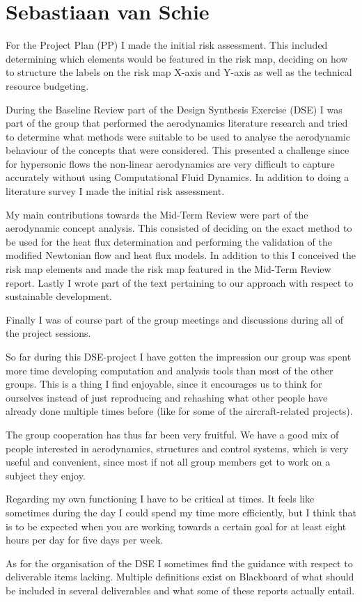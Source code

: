 \section{Sebastiaan van Schie}
For the Project Plan (PP) I made the initial risk assessment. This included determining which elements would be featured in the risk map, deciding on how to structure the labels on the risk map X-axis and Y-axis as well as the technical resource budgeting.

During the Baseline Review part of the Design Synthesis Exercise (DSE) I was part of the group that performed the aerodynamics literature research and tried to determine what methods were suitable to be used to analyse the aerodynamic behaviour of the concepts that were considered. This presented a challenge since for hypersonic flows the non-linear aerodynamics are very difficult to capture accurately without using Computational Fluid Dynamics. In addition to doing a literature survey I made the initial risk assessment.

My main contributions towards the Mid-Term Review were part of the aerodynamic concept analysis. This consisted of deciding on the exact method to be used for the heat flux determination and performing the validation of the modified Newtonian flow and heat flux models. In addition to this I conceived the risk map elements and made the risk map featured in the Mid-Term Review report. Lastly I wrote part of the text pertaining to our approach with respect to sustainable development.

Finally I was of course part of the group meetings and discussions during all of the project sessions. 

So far during this DSE-project I have gotten the impression our group was spent more time developing computation and analysis tools than most of the other groups. This is a thing I find enjoyable, since it encourages us to think for ourselves instead of just reproducing and rehashing what other people have already done multiple times before (like for some of the aircraft-related projects). 

The group cooperation has thus far been very fruitful. We have a good mix of people interested in aerodynamics, structures and control systems, which is very useful and convenient, since most if not all group members get to work on a subject they enjoy.

Regarding my own functioning I have to be critical at times. It feels like sometimes during the day I could spend my time more efficiently, but I think that is to be expected when you are working towards a certain goal for at least eight hours per day for five days per week.

As for the organisation of the DSE I sometimes find the guidance with respect to deliverable items lacking. Multiple definitions exist on Blackboard of what should be included in several deliverables and what some of these reports actually entail.